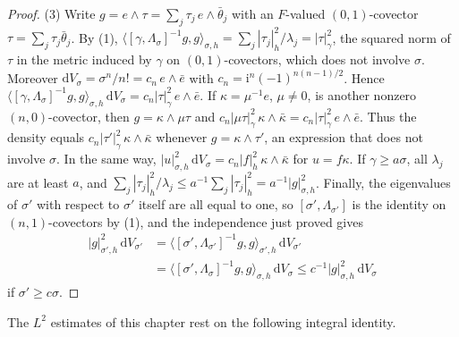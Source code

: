 \begin{proof}
(3) Write $g=e\wedge\tau=\sum_j\tau_j\,e\wedge\bar\theta_j$ with an $F$-valued $(0,1)$-covector $\tau=\sum_j\tau_j\bar\theta_j$. By (1), $\langle[\gamma,\Lambda_\sigma]^{-1}g,g\rangle_{\sigma,h}=\sum_j|\tau_j|_h^2/\lambda_j=|\tau|_\gamma^2$, the squared norm of $\tau$ in the metric induced by $\gamma$ on $(0,1)$-covectors, which does not involve $\sigma$. Moreover $\mathrm dV_\sigma=\sigma^n/n!=c_n\,e\wedge\bar e$ with $c_n=\mathrm i^n(-1)^{n(n-1)/2}$. Hence $\langle[\gamma,\Lambda_\sigma]^{-1}g,g\rangle_{\sigma,h}\,\mathrm dV_\sigma=c_n|\tau|_\gamma^2\,e\wedge\bar e$. If $\kappa=\mu^{-1}e$, $\mu\neq0$, is another nonzero $(n,0)$-covector, then $g=\kappa\wedge\mu\tau$ and $c_n|\mu\tau|_\gamma^2\,\kappa\wedge\bar\kappa=c_n|\tau|_\gamma^2\,e\wedge\bar e$. Thus the density equals $c_n|\tau'|_\gamma^2\,\kappa\wedge\bar\kappa$ whenever $g=\kappa\wedge\tau'$, an expression that does not involve $\sigma$. In the same way, $|u|_{\sigma,h}^2\,\mathrm dV_\sigma=c_n|f|_h^2\,\kappa\wedge\bar\kappa$ for $u=f\kappa$. If $\gamma\geq a\sigma$, all $\lambda_j$ are at least $a$, and $\sum_j|\tau_j|_h^2/\lambda_j\leq a^{-1}\sum_j|\tau_j|_h^2=a^{-1}|g|_{\sigma,h}^2$. Finally, the eigenvalues of $\sigma'$ with respect to $\sigma'$ itself are all equal to one, so $[\sigma',\Lambda_{\sigma'}]$ is the identity on $(n,1)$-covectors by (1), and the independence just proved gives
\[
 \begin{aligned}
 |g|_{\sigma',h}^2\,\mathrm dV_{\sigma'}&=\langle[\sigma',\Lambda_{\sigma'}]^{-1}g,g\rangle_{\sigma',h}\,\mathrm dV_{\sigma'}\\
 &=\langle[\sigma',\Lambda_\sigma]^{-1}g,g\rangle_{\sigma,h}\,\mathrm dV_\sigma\leq c^{-1}|g|_{\sigma,h}^2\,\mathrm dV_\sigma
 \end{aligned}
\]
if $\sigma'\geq c\sigma$.
\end{proof}

The $L^2$ estimates of this chapter rest on the following integral identity.

